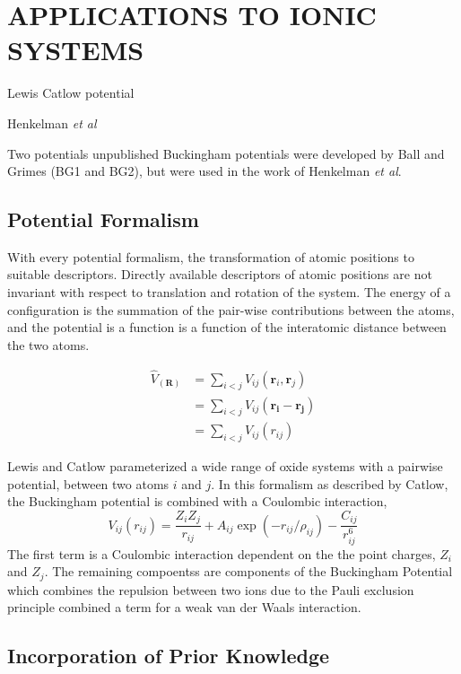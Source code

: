 \chapter{APPLICATIONS TO IONIC SYSTEMS}

Lewis Catlow potential\cite{lewis1985_buckingham}

Henkelman \emph{et al}\cite{henkelman2005_buckingham_MgO}


Two potentials unpublished Buckingham potentials were developed by Ball and Grimes (BG1 and BG2), but were used in the work of Henkelman \emph{et al}\cite{henkelman2005_buckingham_MgO}.

\section{Potential Formalism}

With every potential formalism, the transformation of atomic positions to suitable descriptors.  
Directly available descriptors of atomic positions are not invariant with respect to translation and rotation of the system.  
The energy of a configuration is the summation of the pair-wise contributions between the atoms, and the potential is a function is a function of the interatomic distance between the two atoms.

\begin{align*}
	\hat{V}_(\bm{R}) &= \sum_{i<j} V_{ij}(\bm{r}_{i},\bm{r}_{j}) \\
	                 &= \sum_{i<j} V_{ij}(\bm{r_i}-\bm{r_j}) \\
			 &= \sum_{i<j} V_{ij}(r_{ij})
\end{align*}

Lewis and Catlow\cite{lewis1985_buckingham} parameterized a wide range of oxide systems with a pairwise potential, between two atoms $i$ and $j$.   
In this formalism as described by Catlow\cite{catlow1977_buckingham}, the Buckingham potential\cite{buckingham1938} is combined with a Coulombic interaction,
\begin{equation}
  V_{ij}(r_{ij})=\frac{Z_i Z_j}{r_{ij}}+A_{ij}\exp(-r_{ij}/\rho_{ij})-\frac{C_{ij}}{r_{ij}^6}
\end{equation}
The first term is a Coulombic interaction dependent on the the point charges, $Z_i$ and $Z_j$.
The remaining compoentss are components of the Buckingham Potential which combines the repulsion between two ions due to the Pauli exclusion principle combined a term for a weak van der Waals interaction.

\section{Incorporation of Prior Knowledge}

